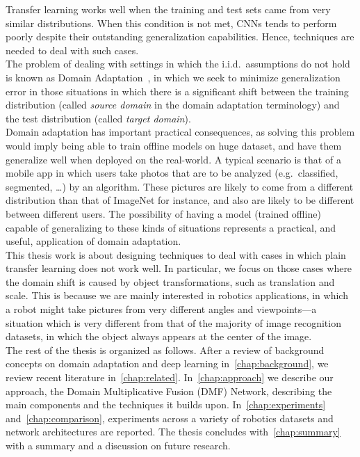 \documentclass[../main.tex]{subfiles}
\begin{document}
    Transfer learning works well when the training and test sets came from very similar distributions. When this condition
    is not met, CNNs tends to perform poorly despite their outstanding generalization capabilities.
    Hence, techniques are needed to deal with such cases. \\
	The problem of dealing with settings in which the i.i.d.\ assumptions
	do not hold is known as Domain Adaptation~\cite{domain-adaptation-review}, in which we seek to minimize generalization error
	in those situations in which there is a significant shift between the training distribution
    (called \textit{source domain} in the domain adaptation terminology) and the test distribution (called \textit{target domain}). \\
    Domain adaptation has important practical consequences, as solving this problem would imply being able to train offline models
    on huge dataset, and have them generalize well when deployed on the real-world.
    A typical scenario is that of a mobile app in which users take photos that are to be analyzed (e.g.\ classified, segmented, \ldots) by
    an algorithm. These pictures are likely to come from a different distribution than that of ImageNet for instance, and also are likely
    to be different between different users.
    The possibility of having a model (trained offline) capable of generalizing to these kinds of situations represents a practical, and
    useful, application of domain adaptation. \\

    This thesis work is about designing techniques to deal with cases in which plain transfer learning does not work well.
	In particular, we focus on those cases where the domain shift is caused by object transformations, such as
    translation and scale. This is because we are mainly interested in robotics applications, in which a robot
    might take pictures from very different angles and viewpoints---a situation which is very different from that of
    the majority of image recognition datasets, in which the object always appears at the center of the image. \\

    The rest of the thesis is organized as follows. After a review of background concepts on domain
    adaptation and deep learning in~\autoref{chap:background}, we review recent literature in~\autoref{chap:related}.
    In~\autoref{chap:approach} we describe our approach, the Domain Multiplicative Fusion (DMF) Network, describing
    the main components and the techniques it builds upon. In~\autoref{chap:experiments} and~\autoref{chap:comparison},
    experiments across a variety of robotics datasets and network architectures are reported.
    The thesis concludes with~\autoref{chap:summary} with a summary and a discussion on future research.
\end{document}

